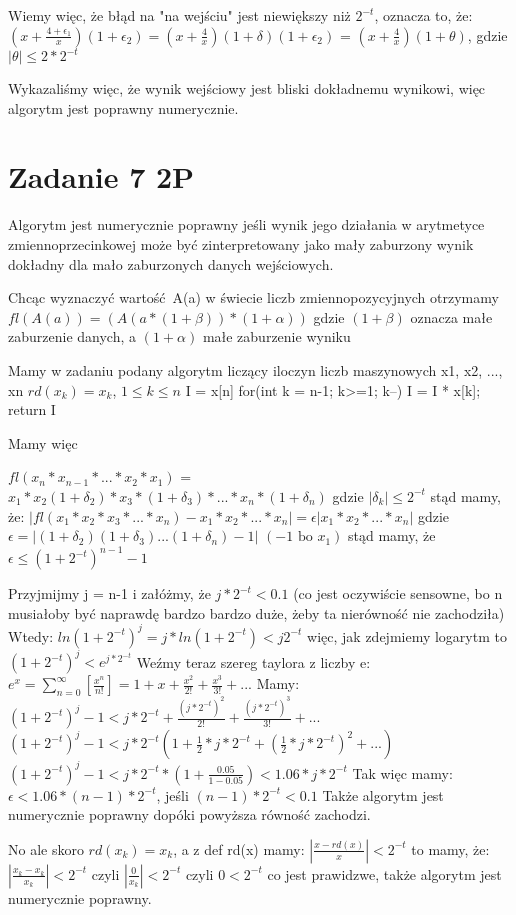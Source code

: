 \documentclass[12pt]{article}
\begin{document}
Wiemy więc, że błąd na "na wejściu" jest niewiększy niż $2^{-t}$, oznacza to, że:
$(x+\frac{4+\epsilon_1}{x})(1+\epsilon_2) = (x+\frac{4}{x})(1+\delta)(1+\epsilon_2)$ = $(x+\frac{4}{x})(1+\theta)$, gdzie $|\theta| \leq 2*2^{-t}$

Wykazaliśmy więc, że wynik wejściowy jest bliski dokładnemu wynikowi, więc algorytm jest poprawny numerycznie.
\section{Zadanie 7 2P}
Algorytm jest numerycznie poprawny jeśli wynik jego działania w arytmetyce zmiennoprzecinkowej może być zinterpretowany jako mały zaburzony wynik dokładny dla mało zaburzonych danych wejściowych.

Chcąc wyznaczyć wartość A(a) w świecie liczb zmiennopozycyjnych otrzymamy
$fl(A(a)) = (A(a * (1 + \beta)) * (1 + \alpha))$
gdzie $(1 + \beta)$ oznacza małe zaburzenie danych, a $(1 + \alpha)$ małe zaburzenie wyniku

Mamy w zadaniu podany algorytm liczący iloczyn liczb maszynowych x1, x2, ..., xn
$rd(x_k) = x_k$, $1 \leq k \leq n$
I = x[n]
for(int k = n-1; k>=1; k--){
    I = I * x[k];
}
return I

Mamy więc

$fl(x_n * x_{n-1} * ... * x_2 * x_1)$ = $x_1*x_2(1+\delta_2)*x_3*(1+\delta_3)*...*x_n*(1+\delta_n)$
gdzie 
$|\delta_k| \leq 2^{-t}$
stąd mamy, że:
$|fl(x_1*x_2*x_3*...*x_n) - x_1*x_2*...*x_n| = \epsilon|x_1*x_2*...*x_n|$
gdzie 
$\epsilon = |(1+\delta_2)(1+\delta_3)...(1+\delta_n) - 1|$
$(-1 \text{ bo } x_1)$
stąd mamy, że 
$\epsilon \leq (1+2^{-t})^{n-1} - 1$

Przyjmijmy j = n-1 i załóżmy, że $j * 2^{-t} < 0.1$ (co jest oczywiście sensowne, bo n musiałoby być naprawdę bardzo bardzo duże, żeby ta nierówność nie zachodziła) Wtedy:
$ln(1+2^{-t})^j = j*ln(1+2^{-t}) < j2^{-t}$ 
więc, jak zdejmiemy logarytm to
$(1+2^{-t})^j < e^{j*2^{-t}}$
Weźmy teraz szereg taylora z liczby e:
$e^x = \sum_{n=0}^{\infty} [\frac{x^n}{n!}] = 1 + x + \frac{x^2}{2!} + \frac{x^3}{3!} + ...$
Mamy:
$(1+2^{-t})^j-1 < j*2^{-t} + \frac{(j*2^{-t})^2}{2!} + \frac{(j*2^{-t})^3}{3!} + ...$
$(1+2^{-t})^j-1 < j*2^{-t} (1 + \frac{1}{2}*j*2^{-t} + (\frac{1}{2}*j*2^{-t})^2 + ...)$
$(1+2^{-t})^j-1 < j*2^{-t}*(1 + \frac{0.05}{1-0.05}) < 1.06*j*2^{-t}$
Tak więc mamy:
$\epsilon < 1.06*(n-1)*2^{-t}$, jeśli $(n-1)*2^{-t} < 0.1$
Także algorytm jest numerycznie poprawny dopóki powyższa równość zachodzi.

No ale skoro $rd(x_k) = x_k$, a z def rd(x) mamy:
$|\frac{x-rd(x)}{x}| < 2^{-t}$
to mamy, że:
$|\frac{x_k-x_k}{x_k}| < 2^{-t}$
czyli
$|\frac{0}{x_k}| < 2^{-t}$
czyli
$0 < 2^{-t}$
co jest prawidzwe, także algorytm jest numerycznie poprawny.




\egroup
\end{document}
